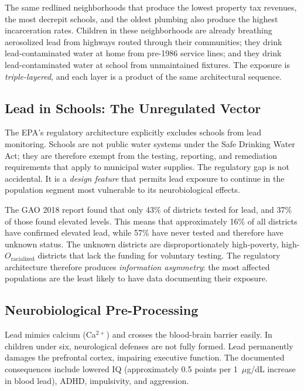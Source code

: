 The same redlined neighborhoods that produce the lowest property tax revenues, the most decrepit schools, and the oldest plumbing also produce the highest incarceration rates. Children in these neighborhoods are already breathing aerosolized lead from highways routed through their communities; they drink lead-contaminated water at home from pre-1986 service lines; and they drink lead-contaminated water at school from unmaintained fixtures. The exposure is \textit{triple-layered}, and each layer is a product of the same architectural sequence.

\subsection{Lead in Schools: The Unregulated Vector}

The EPA's regulatory architecture explicitly excludes schools from lead monitoring. Schools are not public water systems under the Safe Drinking Water Act; they are therefore exempt from the testing, reporting, and remediation requirements that apply to municipal water supplies. The regulatory gap is not accidental. It is a \textit{design feature} that permits lead exposure to continue in the population segment most vulnerable to its neurobiological effects.

The GAO 2018 report found that only 43\% of districts tested for lead, and 37\% of those found elevated levels. This means that approximately 16\% of all districts have confirmed elevated lead, while 57\% have never tested and therefore have unknown status. The unknown districts are disproportionately high-poverty, high-$O_{\text{racialized}}$ districts that lack the funding for voluntary testing. The regulatory architecture therefore produces \textit{information asymmetry}: the most affected populations are the least likely to have data documenting their exposure.

\subsection{Neurobiological Pre-Processing}

Lead mimics calcium (Ca$^{2+}$) and crosses the blood-brain barrier easily. In children under six, neurological defenses are not fully formed. Lead permanently damages the prefrontal cortex, impairing executive function. The documented consequences include lowered IQ (approximately 0.5 points per 1~$\mu$g/dL increase in blood lead), ADHD, impulsivity, and aggression.

